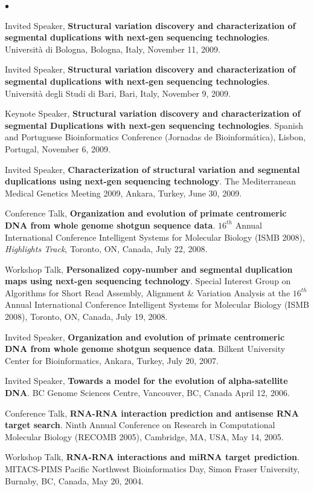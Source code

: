 \documentclass[margin,line]{res}
\newenvironment{list2}{
  \begin{list}{$\bullet$}{%
      \setlength{\itemsep}{0in}
      \setlength{\parsep}{0in} \setlength{\parskip}{0in}
      \setlength{\topsep}{0in} \setlength{\partopsep}{0in} 
      \setlength{\leftmargin}{0.2in}}}{\end{list}}
\begin{document}
\begin{resume}
\begin{list2}
\item 
  Invited Speaker, {\bf Structural variation discovery and characterization of segmental duplications with next-gen sequencing technologies}.
  Universit\`{a} di Bologna,
  Bologna, Italy, November 11, 2009.

\item 
  Invited Speaker, {\bf Structural variation discovery and characterization of segmental duplications with next-gen sequencing technologies}.
  Universit\`{a} degli Studi di Bari, 
  Bari, Italy, November 9, 2009.

\item 
  Keynote Speaker, {\bf Structural variation discovery and characterization of segmental Duplications with next-gen sequencing technologies}.
 Spanish and Portuguese Bioinformatics Conference (Jornadas de Bioinform\'{a}tica),
 Lisbon, Portugal, November 6, 2009.
\item 
  Invited Speaker, {\bf Characterization of structural variation and segmental duplications using next-gen sequencing technology}.
  The Mediterranean Medical Genetics Meeting 2009, Ankara, Turkey, June 30, 2009. 

\item
  Conference Talk, 
  {\bf Organization and evolution of primate centromeric DNA
from whole genome shotgun sequence data}.  $16^{th}$ Annual
International Conference Intelligent Systems for Molecular Biology (ISMB 2008), {\em Highlights Track},
Toronto, ON, Canada, July 22, 2008.

\item
  Workshop Talk, {\bf Personalized copy-number and segmental duplication maps using next-gen sequencing technology}.
Special Interest Group on Algorithms for Short Read Assembly, Alignment \& Variation Analysis at the
 $16^{th}$ Annual
International Conference Intelligent Systems for Molecular Biology (ISMB 2008),
Toronto, ON, Canada, July 19, 2008.

\item
  Invited Speaker, {\bf Organization and evolution of primate centromeric DNA
from whole genome shotgun sequence data}. Bilkent University Center for Bioinformatics,
Ankara, Turkey, July 20, 2007.

\item
  Invited Speaker, {\bf Towards a model for the evolution of alpha-satellite DNA}.
  BC Genome Sciences Centre, Vancouver, BC, Canada April 12, 2006.

\item  
  Conference Talk, {\bf RNA-RNA interaction prediction and antisense RNA target search}.
  Ninth Annual Conference on Research in Computational Molecular Biology (RECOMB 2005),
  Cambridge, MA, USA, May 14, 2005.
  
\item
 
  Workshop Talk, {\bf RNA-RNA interactions and miRNA target prediction}.
  MITACS-PIMS Pacific Northwest Bioinformatics Day, Simon Fraser University, Burnaby, BC, Canada, 
  May 20, 2004.

 
\end{list2}

\clearpage


\end{resume}
\end{document}
